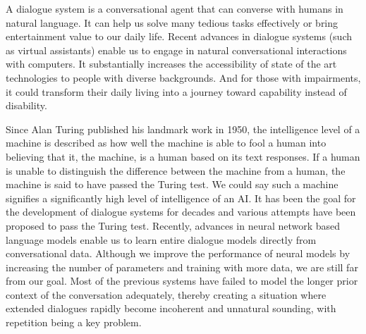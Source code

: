 \documentclass[bsc,frontabs,twoside,singlespacing,parskip,deptreport]{infthesis}     %
\begin{document}
A dialogue system is a conversational agent that can converse with humans in natural language. It can help us solve many tedious tasks effectively or bring entertainment value to our daily life. Recent advances in dialogue systems (such as virtual assistants\cite{alexa,cortana,siri}) enable us to engage in natural conversational interactions with computers. It substantially increases the accessibility of state of the art technologies to people with diverse backgrounds. And for those with impairments, it could transform their daily living into a journey toward capability instead of disability.

Since Alan Turing published his landmark work in 1950\cite{turing1950computing}, the intelligence level of a machine is described as how well the machine is able to fool a human into believing that it, the machine, is a human based on its text responses. If a human is unable to distinguish the difference between the machine from a human, the machine is said to have passed the Turing test. We could say such a machine signifies a significantly high level of intelligence of an AI. It has been the goal for the development of dialogue systems for decades and various attempts have been proposed to pass the Turing test. Recently, advances in neural network based language models enable us to learn entire dialogue models directly from conversational data. Although we improve the performance of neural models by increasing the number of parameters and training with more data, we are still far from our goal. Most of the previous systems have failed to model the longer prior context of the conversation adequately, thereby creating a situation where extended dialogues rapidly become incoherent and unnatural sounding, with repetition being a key problem. 
\end{document}

